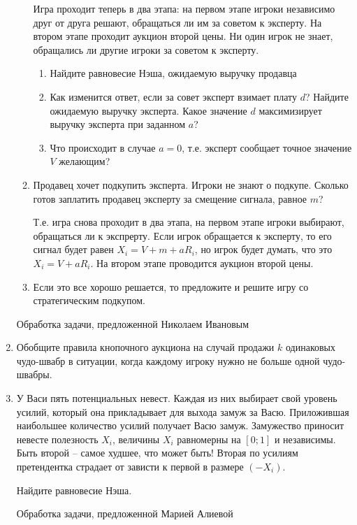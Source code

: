 \begin{enumerate}
\begin{enumerate}
Игра проходит теперь в два этапа: на первом этапе игроки независимо друг от друга решают, обращаться ли им за советом к эксперту. На втором этапе проходит аукцион второй цены. Ни один игрок не знает, обращались ли другие игроки за советом к эксперту.

\begin{enumerate}
\item Найдите равновесие Нэша, ожидаемую выручку продавца
\item Как изменится ответ, если за совет эксперт взимает плату $d$? Найдите ожидаемую выручку эксперта. Какое значение $d$ максимизирует выручку эксперта при заданном $a$?
\item Что происходит в случае $a=0$, т.е. эксперт сообщает точное значение $V$ желающим?
\end{enumerate}
 
\item Продавец хочет подкупить эксперта. Игроки не знают о подкупе. Сколько готов заплатить продавец эксперту за смещение сигнала, равное $m$? 

Т.е. игра снова проходит в два этапа, на первом этапе игроки выбирают, обращаться ли к экспрерту. Если игрок обращается к эксперту, то его сигнал будет равен $X_{i}=V+m+aR_{i}$, но игрок будет думать, что это $X_{i}=V+aR_{i}$. На втором этапе проводится аукцион второй цены.

\item Если это все хорошо решается, то предложите и решите игру со стратегическим подкупом.

\end{enumerate}

Обработка задачи, предложенной Николаем Ивановым


\item Обобщите правила кнопочного аукциона на случай продажи $k$ одинаковых чудо-швабр в ситуации, когда каждому игроку нужно не больше одной чудо-швабры.


\item У Васи пять потенциальных невест. Каждая из них выбирает свой уровень усилий, который она прикладывает для выхода замуж за Васю. Приложившая наибольшее количество усилий получает Васю замуж. Замужество приносит невесте полезность $X_{i}$, величины $X_{i}$ равномерны на $[0;1]$ и независимы. Быть второй -- самое худшее, что может быть! Вторая по усилиям претендентка страдает от зависти к первой в размере $(-X_{i})$.

Найдите равновесие Нэша.


Обработка задачи, предложенной Марией Алиевой


\end{enumerate}
